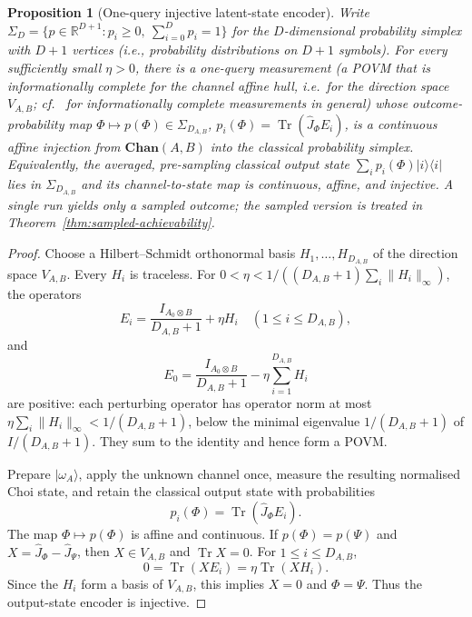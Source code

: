 \documentclass[11pt,a4paper]{article}
\theoremstyle{definition}
\theoremstyle{plain}
\newtheorem{proposition}[theorem]{Proposition}
\theoremstyle{remark}
\DeclareMathOperator{\Tr}{Tr}
\newcommand{\Chan}{\mathbf{Chan}}
\begin{document}
\begin{proposition}[One-query injective latent-state encoder]
\label{prop:one-query-injective}
Write $\Sigma_D=\{p\in\mathbb R^{D+1}:p_i\geq0,\ \sum_{i=0}^Dp_i=1\}$ for the $D$-dimensional probability simplex with $D+1$ vertices (i.e., probability distributions on $D+1$ symbols).
For every sufficiently small $\eta>0$, there is a one-query measurement (a POVM that is informationally complete for the channel affine hull, i.e.\ for the direction space $V_{A,B}$; cf.~\cite{Scott2006} for informationally complete measurements in general) whose outcome-probability map $\Phi\mapsto p(\Phi)\in\Sigma_{D_{A,B}}$, $p_i(\Phi)=\Tr(\widehat J_\Phi E_i)$, is a continuous affine injection from $\Chan(A,B)$ into the classical probability simplex. Equivalently, the averaged, pre-sampling classical output state $\sum_i p_i(\Phi)|i\rangle\langle i|$ lies in $\Sigma_{D_{A,B}}$ and its channel-to-state map is continuous, affine, and injective. A single run yields only a sampled outcome; the sampled version is treated in Theorem~\ref{thm:sampled-achievability}.
\end{proposition}

\begin{proof}
Choose a Hilbert--Schmidt orthonormal basis
$H_1,\ldots,H_{D_{A,B}}$ of the direction space $V_{A,B}$. Every $H_i$ is
traceless. For $0<\eta<1/((D_{A,B}+1)\sum_i\|H_i\|_\infty)$, the operators
\[
E_i=\frac{I_{A_0\otimes B}}{D_{A,B}+1}+\eta H_i
\quad(1\leq i\leq D_{A,B}),
\]
and
\[
E_0=\frac{I_{A_0\otimes B}}{D_{A,B}+1}
-\eta\sum_{i=1}^{D_{A,B}}H_i
\]
are positive: each perturbing operator has operator norm at most $\eta\sum_i\|H_i\|_\infty<1/(D_{A,B}+1)$, below the minimal eigenvalue $1/(D_{A,B}+1)$ of $I/(D_{A,B}+1)$. They sum to the identity and hence form a POVM.

Prepare $|\omega_A\rangle$, apply the unknown channel once, measure the
resulting normalised Choi state, and retain the classical output state with
probabilities
\[
p_i(\Phi)=\Tr(\widehat J_\Phi E_i).
\]
The map $\Phi\mapsto p(\Phi)$ is affine and continuous. If
$p(\Phi)=p(\Psi)$ and $X=\widehat J_\Phi-\widehat J_\Psi$, then
$X\in V_{A,B}$ and $\Tr X=0$. For $1\leq i\leq D_{A,B}$,
\[
0=\Tr(XE_i)=\eta\Tr(XH_i).
\]
Since the $H_i$ form a basis of $V_{A,B}$, this implies $X=0$ and
$\Phi=\Psi$. Thus the output-state encoder is injective.
\end{proof}
\end{document}

